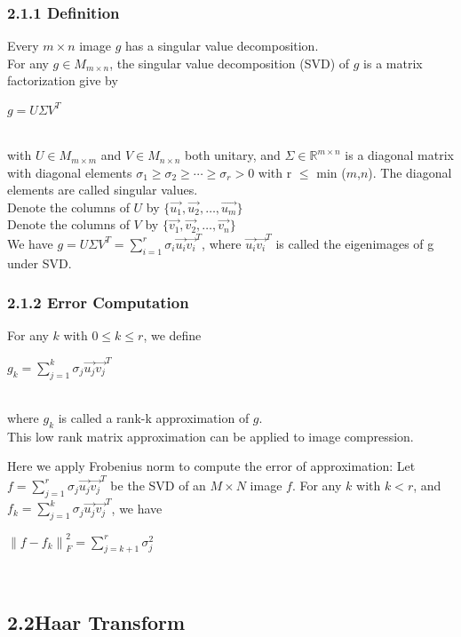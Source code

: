 \documentclass[12pt]{article}
\begin{document}
\subsubsection*{2.1.1 \quad Definition}
Every $m\times n$ image $g$ has a singular value decomposition.\\
For any $g \in M_{m \times n}$, the singular value decomposition (SVD) of $g$ is
 a matrix factorization give by \\
 \centerline{$g = U \Sigma V^T$}\\
 with $U \in M_{m \times m}$ and $V \in M_{n \times n}$ both unitary, and $\Sigma \in 
 \mathbb{R}^{m \times n}$ is a diagonal matrix with diagonal elements 
 $\sigma_1 \geq\sigma_2\geq\cdots\geq\sigma_r > 0$ with r $\leq$ min ($m$,$n$). 
 The diagonal elements are called singular values. \\
Denote the columns of $U$ by $\{\vec{u_1},\vec{u_2},\ldots,\vec{u_m}\}$\\
Denote the columns of $V$ by $\{\vec{v_1},\vec{v_2},\ldots,\vec{v_n}\}$\\
We have $g = U \Sigma V^T = \sum_{i=1}^{r}\sigma_i \vec{u_i}\vec{v_i}^T$, where $\vec{u_i}\vec{v_i}^T$ is called the eigenimages of g under SVD.\\

\subsubsection*{2.1.2 \quad Error Computation}
For any $k$ with $0\leq k \leq r$, we define\\
\centerline{$g_k = \sum_{j=1}^{k}\sigma_j \vec{u_j}\vec{v_j}^T$} \\
where $g_k$ is called a rank-k approximation of $g$.\\
This low rank matrix approximation can be applied to image compression. 

Here we apply Frobenius norm to compute the error of approximation:
Let $f=\sum_{j=1}^{r}\sigma_j \vec{u_j}\vec{v_j}^T$  be the SVD of an $M \times N$ image $f$.
For any $k$ with $k<r$, and $f_k = \sum_{j=1}^{k}\sigma_j \vec{u_j}\vec{v_j}^T$, we have\\
\centerline{${\parallel f-f_k\parallel}_F^2 = \sum_{j=k+1}^{r}\sigma_j^2$}\\

\subsection*{2.2\quad Haar Transform}
\end{document}
